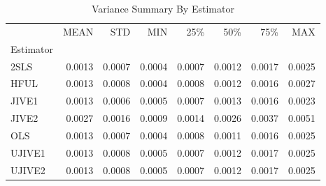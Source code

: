 \begin{table}[ht]
\centering
\caption{Variance Summary By Estimator}
\begin{tabular}{lrrrrrrr}
\toprule
 & MEAN & STD & MIN & 25\% & 50\% & 75\% & MAX \\
Estimator &  &  &  &  &  &  &  \\
\midrule
2SLS & 0.0013 & 0.0007 & 0.0004 & 0.0007 & 0.0012 & 0.0017 & 0.0025 \\
HFUL & 0.0013 & 0.0008 & 0.0004 & 0.0008 & 0.0012 & 0.0016 & 0.0027 \\
JIVE1 & 0.0013 & 0.0006 & 0.0005 & 0.0007 & 0.0013 & 0.0016 & 0.0023 \\
JIVE2 & 0.0027 & 0.0016 & 0.0009 & 0.0014 & 0.0026 & 0.0037 & 0.0051 \\
OLS & 0.0013 & 0.0007 & 0.0004 & 0.0008 & 0.0011 & 0.0016 & 0.0025 \\
UJIVE1 & 0.0013 & 0.0008 & 0.0005 & 0.0007 & 0.0012 & 0.0017 & 0.0025 \\
UJIVE2 & 0.0013 & 0.0008 & 0.0005 & 0.0007 & 0.0012 & 0.0017 & 0.0025 \\
\bottomrule
\end{tabular}
\end{table}
